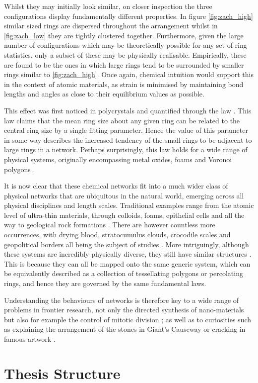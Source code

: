 Whilst they may initially look similar, on closer inspection the three configurations display fundamentally different properties.
In figure \ref{fig:zach_high} similar sized rings are dispersed throughout the arrangement whilst in \ref{fig:zach_low} they are tightly clustered together.
Furthermore, given the large number of configurations which may be theoretically possible for any set of ring statistics, only a subset of these may be physically realisable.
Empirically, these are found to be the ones in which large rings tend to be surrounded by smaller rings \ie{} similar to \ref{fig:zach_high}.
Once again, chemical intuition would support this in the context of atomic materials, as strain is minimised by maintaining bond lengths and angles as close to their equilibrium values as possible.

This effect was first noticed in polycrystals and quantified through the \aw{} law \cite{Aboav1970,Weaire1974}.
This law claims that the mean ring size about any given ring can be related to the central ring size by a single fitting parameter.
Hence the value of this parameter in some way describes the increased tendency of the small rings to be adjacent to large rings in a network.
Perhaps surprisingly, this law holds for a wide range of physical systems, originally encompassing metal oxides, foams and Voronoi polygons \cite{Aboav1980,Boots1984}.

It is now clear that these chemical networks fit into a much wider class of \td{} physical networks that are ubiquitous in the natural world, emerging across all physical disciplines and length scales.
Traditional examples range from the atomic level of ultra\--thin materials, through colloids, foams, epithelial cells and all the way to geological rock formations \cite{Earnshaw1994,Allain1995,Durand2011,Tong2017,Goehring2014}.
There are however countless more occurrences, with drying blood, stratocumulus clouds, crocodile scales and geopolitical borders all being the subject of studies \cite{Brutin2011,Glassmeier2017,Milinkovitch2019,LeCaer1993}.
More intriguingly, although these systems are incredibly physically diverse, they still have similar structures \cite{Schliecker1999}. 
This is because they can all be mapped onto the same generic system, which can be equivalently described as a collection of tessellating polygons or percolating rings, and hence they are governed by the same fundamental laws. 

Understanding the behaviours of \td{} networks is therefore key to a wide range of problems in frontier research, not only the directed synthesis of nano\--materials but also for example the control of mitotic division \cite{Malashevich2016,Gibson2011,Ladan2019}; as well as to curiosities such as explaining the arrangement of the stones in Giant's Causeway or cracking in famous artwork \cite{Weaire1984,Flores2017}.


 



\section{Thesis Structure}



